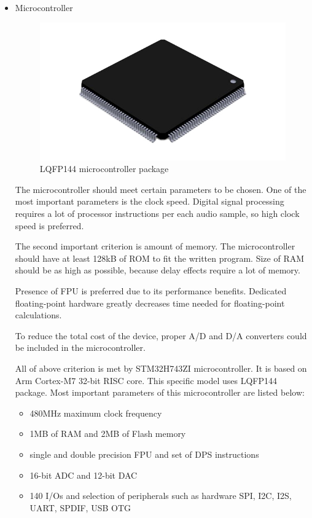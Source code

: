 \documentclass[a4paper,twoside,12pt]{book}
\begin{document}
\begin{itemize}
    \item Microcontroller
    
    \begin{figure}[H]
        \centering
        \includegraphics[width=\textwidth]{images/lqfp}
        \caption{LQFP144 microcontroller package}
        \label{fig:LQFP}
    \end{figure}

    The microcontroller should meet certain parameters to be chosen.
    One of the most important parameters is the clock speed.
    Digital signal processing requires a lot of processor instructions
    per each audio sample, so high clock speed is preferred.

    The second important criterion is amount of memory.
    The microcontroller should have at least 128kB of ROM
    to fit the written program.
    Size of RAM should be as high as possible,
    because delay effects require a lot of memory.

    Presence of FPU is preferred due to its performance benefits.
    Dedicated floating-point hardware greatly decreases time
    needed for floating-point calculations.

    To reduce the total cost of the device,
    proper A/D and D/A converters could be included in the microcontroller.

    All of above criterion is met by STM32H743ZI microcontroller.
    It is based on Arm Cortex-M7 32-bit RISC core.
    This specific model uses LQFP144 package.
    Most important parameters of this microcontroller are listed below:
    \begin{itemize}
        \item 480MHz maximum clock frequency
        \item 1MB of RAM and 2MB of Flash memory
        \item single and double precision FPU and set of DPS instructions
        \item 16-bit ADC and 12-bit DAC
        \item 140 I/Os and selection of peripherals such as hardware
        SPI, I2C, I2S, UART, SPDIF, USB OTG
    \end{itemize}


\end{itemize}
\end{document}
